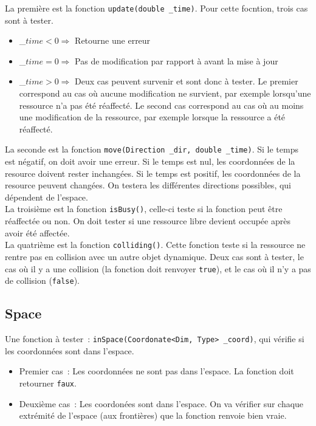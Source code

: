 La première est la fonction \texttt{update(double \_time)}. Pour cette focntion, trois cas sont à tester.
\begin{itemize}
\item \_$time < 0 \Rightarrow$ Retourne une erreur
\item \_$time = 0 \Rightarrow$ Pas de modification par rapport à avant la mise à jour
\item \_$time > 0 \Rightarrow$ Deux cas peuvent survenir et sont donc à tester. Le premier correspond au cas où aucune modification ne survient, par exemple lorsqu'une ressource n'a pas été réaffecté. Le second cas correspond au cas où au moins une modification de la ressource, par exemple lorsque la ressource a été réaffecté.\\
\end{itemize}

La seconde est la fonction \texttt{move(Direction \_dir, double \_time)}.
Si le temps est négatif, on doit avoir une erreur. Si le temps est nul, les coordonnées de la resource doivent rester inchangées. Si le temps est positif, les coordonnées de la resource peuvent changées. On testera les différentes directions possibles, qui dépendent de l'espace. \\

La troisième est la fonction \texttt{isBusy()}, celle-ci teste si la fonction peut être réaffectée ou non. On doit tester si une ressource libre devient occupée après avoir été affectée.\\

La quatrième est la fonction \texttt{colliding()}. Cette fonction teste si la ressource ne rentre pas en collision avec un autre objet dynamique. Deux cas sont à tester, le cas où il y a une collision (la fonction doit renvoyer \texttt{true}), et le cas où il n'y a pas de collision (\texttt{false}).

\subsection{Space}

Une fonction à tester~: \texttt{inSpace(Coordonate<Dim, Type> \_coord)}, qui vérifie si les coordonnées sont dans l'espace.
\begin{itemize}
\item Premier cas~: Les coordonnées ne sont pas dans l'espace. La fonction doit retourner \texttt{faux}.
\item Deuxième cas~: Les coordonées sont dans l'espace. On va vérifier sur chaque extrémité de l'espace (aux frontières) que la fonction renvoie bien vraie.
\end{itemize}

